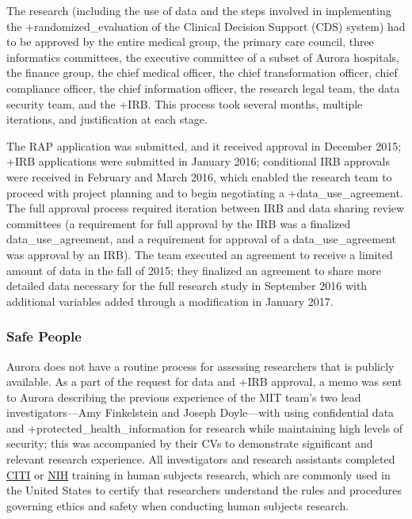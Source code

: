 \documentclass[
]{WileySix}
\begin{document}
The research (including the use of data and the steps involved in implementing the +randomized\_evaluation\textbar{} of the Clinical Decision Support (CDS) system) had to be approved by the entire medical group, the primary care council, three informatics committees, the executive committee of a subset of Aurora hospitals, the finance group, the chief medical officer, the chief transformation officer, chief compliance officer, the chief information officer, the research legal team, the data security team, and the +IRB\textbar. This process took several months, multiple iterations, and justification at each stage.

The RAP application was submitted, and it received approval in December 2015; +IRB\textbar{} applications were submitted in January 2016; conditional IRB approvals were received in February and March 2016, which enabled the research team to proceed with project planning and to begin negotiating a +data\_use\_agreement\textbar. The full approval process required iteration between IRB and data sharing review committees (a requirement for full approval by the IRB was a finalized data\_use\_agreement, and a requirement for approval of a data\_use\_agreement was approval by an IRB). The team executed an agreement to receive a limited amount of data in the fall of 2015; they finalized an agreement to share more detailed data necessary for the full research study in September 2016 with additional variables added through a modification in January 2017.

\hypertarget{safe-people-4}{%
\subsubsection{Safe People}\label{safe-people-4}}

Aurora does not have a routine process for assessing researchers that is publicly available. As a part of the request for data and +IRB\textbar{} approval, a memo was sent to Aurora describing the previous experience of the MIT team's two lead investigators---Amy Finkelstein and Joseph Doyle---with using confidential data and +protected\_health\_information\textbar{} for research while maintaining high levels of security; this was accompanied by their CVs to demonstrate significant and relevant research experience. All investigators and research assistants completed \href{https://about.citiprogram.org/en/homepage/}{CITI} or \href{https://nexus.od.nih.gov/all/2018/09/07/protecting-human-research-participants-phrp-online-tutorial-no-longer-available-as-of-september-26-2018/}{NIH} training in human subjects research, which are commonly used in the United States to certify that researchers understand the rules and procedures governing ethics and safety when conducting human subjects research.
\end{document}
